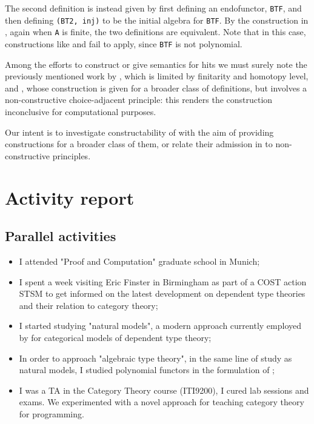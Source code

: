 \documentclass[a4paper]{article}
\begin{document}
The second definition is instead given by first defining an endofunctor, \texttt{BTF}, and then defining \texttt{(BT2, inj)} to be the initial algebra for \texttt{BTF}. By the construction in \cite{Weide2019}, again when \texttt{A} is finite, the two definitions are equivalent. Note that in this case, constructions like \cite{Moerdijk2000} and \cite{Pitts2021} fail to apply, since \texttt{BTF} is not polynomial.

Among the efforts to construct or give semantics for \glspl{hit} we must surely note the previously mentioned work by \textcite{Weide2019}, which is limited by finitarity and homotopy level, and \textcite{Fiore2022}, whose construction is given for a broader class of definitions, but involves a non-constructive choice-adjacent principle: this renders the construction inconclusive for computational purposes.

Our intent is to investigate constructability of  with the aim of providing constructions for a broader class of them, or relate their admission in  to non-constructive principles.

\section{Activity report}

\subsection{Parallel activities}

\begin{itemize}
	\item I attended "Proof and Computation" graduate school in Munich;
	\item I spent a week visiting Eric Finster in Birmingham as part of a COST action STSM to get informed on the latest development on dependent type theories and their relation to category theory;
	\item I started studying "natural models", a modern approach currently employed by \textcite{Awodey2016} for categorical models of dependent type theory;
	\item In order to approach "algebraic type theory", in the same line of study as natural models, I studied polynomial functors in the formulation of \textcite{Gambino2009};
	\item I was a TA in the Category Theory course (ITI9200), I cured lab sessions and exams. We experimented with a novel approach for teaching category theory for programming.
\end{itemize}
\end{document}
